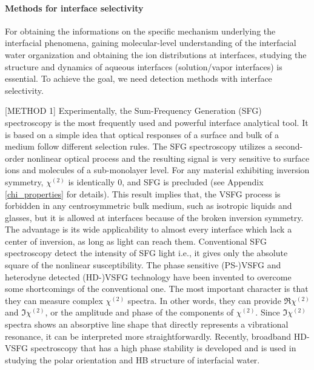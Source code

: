 \paragraph{Methods for interface selectivity}
For obtaining the informations on the specific mechanism underlying the interfacial phenomena,
gaining molecular-level understanding of the interfacial water organization and obtaining the ion distributions at interfaces,
studying the structure and dynamics of aqueous interfaces (solution/vapor interfaces) is essential.
To achieve the goal, we need detection methods with interface selectivity. 

[METHOD 1]
Experimentally, the Sum-Frequency Generation (SFG) spectroscopy is the most frequently used and powerful interface analytical tool\cite{Shen2016,Morita2018,Shen2020}.
It is based on a simple idea that optical responses of a surface and bulk of a medium follow different selection rules.
The SFG spectroscopy utilizes a second-order nonlinear optical process and the resulting signal is very sensitive to surface ions and 
molecules of a sub-monolayer level\cite{Morita2008,WangHongFei2015,WenYuChieh2016,Ishiyama2017,Penalber-Johnstone2018}. 
%
For any material exhibiting inversion symmetry, $\chi^{(2)}$ is identically 0, and SFG is precluded\cite{Franken1963} (see Appendix \ref{chi_properties} for details).
This result implies that, the VSFG process is forbidden in any centrosymmetric bulk medium\cite{Che2012},
such as isotropic liquids and glasses, but it is allowed at interfaces because of the broken inversion symmetry\cite{PF00}.
The advantage is its wide applicability to almost every interface which lack a center of inversion, as long as light can reach them. 
%
Conventional SFG spectroscopy detect the intensity of SFG light
i.e., it gives only the absolute square of the nonlinear susceptibility\cite{Shen84,Guyot-Sionnest1986,Shen2020}. 
The phase sensitive (PS-)VSFG\cite{Ji2008} and heterodyne detected (HD-)VSFG technology have been invented to overcome some shortcomings of the conventional one. 
The most important character is that they can measure complex $\chi^{(2)}$ spectra. 
In other words, they can provide $\Re \chi^{(2)}$ and $\Im \chi^{(2)}$, or the amplitude and phase of the components of $\chi^{(2)}$. 
Since $\Im \chi^{(2)}$ spectra shows an absorptive line shape that directly represents a vibrational resonance, 
it can be interpreted more straightforwardly\cite{Nihonyanagi2013}.
Recently, broadband HD-VSFG spectroscopy that has a high phase stability is developed and is used in studying the polar orientation and HB structure of interfacial
water\cite{Nihonyanagi2009,Shen2013}. 


